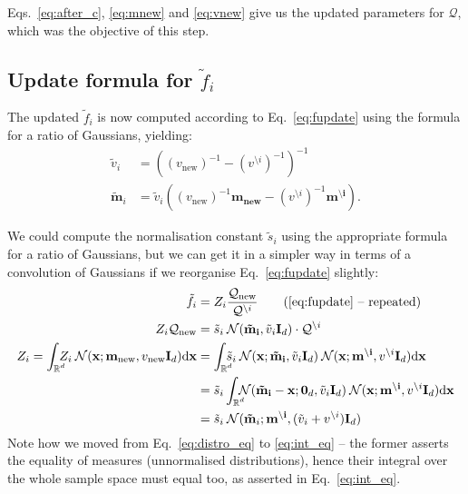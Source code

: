 \documentclass[11pt]{article}
\newcommand{\vek}[1]{\ensuremath{\mathbf{#1}}}
\newcommand{\kve}{\ensuremath{\mathcal{Q}}}
\newcommand{\byd}{\ensuremath{\mathrm{d}}}
\newcommand{\norm}{\ensuremath{\:\mathcal{N}}}
\newcommand{\unity}{\ensuremath{\mathbf{I}}}
\newcommand{\real}{\ensuremath{\mathbb{R}}}
\newcommand{\intrc}{\ensuremath{\int_{\rlap{\scriptsize$\real^d$}}\:}}
\newcommand{\intrcc}{\ensuremath{\int_{\rlap{\scriptsize$\real^d$}}}}
\begin{document}
Eqs.~\eqref{eq:after_c}, \eqref{eq:mnew} and \eqref{eq:vnew} give us the 
updated parameters for $\kve$, which was the objective of this 
step.

\subsection*{Update formula for $\tilde{f}_i$}

The updated $\tilde{f}_i$ is now computed according to 
Eq.~\eqref{eq:fupdate} using the formula for a ratio of Gaussians, 
yielding:
\begin{align}
	\tilde{v}_i &= \left( (v_{\text{new}})^{-1} - (v^{\setminus 
	i})^{-1}\right)^{-1} \\
	\vek{\tilde{m}}_i &= \tilde{v}_i \left( (v_{\text{new}})^{-1}\vek{m_{\text{new}}}
																			- (v^{\setminus i})^{-1}\vek{m^{\setminus i}}\right).
\end{align}

We could compute the normalisation constant $\tilde{s}_i$ using the 
appropriate formula for a ratio of Gaussians, but we can get it in 
a simpler way in terms of a convolution of Gaussians if we reorganise 
Eq.~\eqref{eq:fupdate} slightly:
\begin{align}
	\tilde{f}_i &= Z_i\frac{\kve_{\text{new}}}{\kve^{\setminus i}}
		\tag{\ref{eq:fupdate} -- repeated} \\
	Z_i \kve_{\text{new}} &= \tilde{s}_i \norm(\vek{\tilde{m}_i}, \tilde{v}_i\unity_d)
																		\cdot \kve^{\setminus i}
	\label{eq:distro_eq} \\
	Z_i = \intrc Z_i \norm(\vek{x}; \vek{m_{\text{new}}}, v_{\text{new}}\unity_d) \byd\vek{x}
	   &= \intrc \tilde{s}_i \norm(\vek{x}; \vek{\tilde{m}_i}, \tilde{v}_i\unity_d)
		 											\norm(\vek{x}; \vek{m^{\setminus i}}, v^{\setminus i}\unity_d)
				\byd\vek{x}
				\label{eq:int_eq} \\
		 &= \tilde{s}_i \intrcc \norm(\vek{\tilde{m}_i} - \vek{x}; \vek{0}_d, 
							\tilde{v}_i\unity_d)
							\norm(\vek{x}; \vek{m^{\setminus i}}, v^{\setminus i}\unity_d)
				\byd\vek{x} \\
		 &= \tilde{s}_i \norm(\vek{\tilde{m}}_i;
							\vek{m^{\setminus i}}, (\tilde{v}_i + v^{\setminus i})\unity_d)
			\label{eq:si_rhs}
\end{align}
Note how we moved from Eq.~\eqref{eq:distro_eq} to \eqref{eq:int_eq} -- the 
former asserts the equality of measures (unnormalised distributions), hence 
their integral over the whole sample space must equal too, as asserted in 
Eq.~\eqref{eq:int_eq}.
\end{document}
